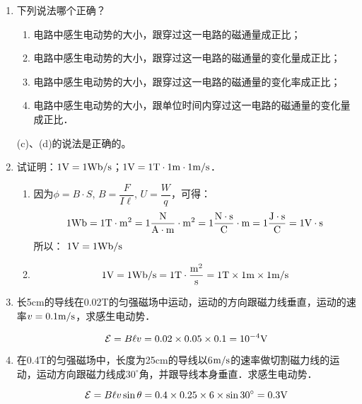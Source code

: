 \begin{enumerate}
    \item 下列说法哪个正确？
    \begin{enumerate}
        \item 电路中感生电动势的大小，跟穿过这一电路的磁通量成正比；
        \item 电路中感生电动势的大小，跟穿过这一电路的磁通量的变化量成正比；
        \item 电路中感生电动势的大小，跟穿过这一电路的磁通量的变化率成正比；
        \item 电路中感生电动势的大小，跟单位时间内穿过这一电路的磁通量的变化量成正比．
    \end{enumerate}

    \begin{solution}
    (c)、(d)的说法是正确的。
    \end{solution}
    
\item 试证明：$1{\rm V}=1{\rm Wb}/{\rm s}$；$1{\rm V}=1{\rm T}\cdot 1{\rm m}\cdot 1\text{m}/\text{s}$．

\begin{solution}
\begin{enumerate}
    \item  因为$\phi=B\cdot S$, $B=\dfrac{F}{I\ell}$, $U=\dfrac{W}{q}$，可得：
   \[ 1{\rm Wb}=1{\rm T\cdot m^2}=1\frac{{\rm N}}{{\rm A\cdot m}}\cdot {\rm m^2}=1\frac{{\rm N\cdot s}}{{\rm C}}\cdot {\rm m}=1\frac{\rm J\cdot s}{\rm C}=1{\rm V\cdot s}\]
    所以： $1{\rm V}=1{\rm Wb}/{\rm s}$
    \item  \[1{\rm V}=1{\rm Wb/s}=1{\rm T}\cdot \frac{\rm m^2}{\rm s}=1{\rm T}\times 1{\rm m}\times 1\text{m}/\text{s}\]
\end{enumerate}
\end{solution}

\item  长5cm的导线在0.02T的匀强磁场中运动，运动的方向跟磁力线垂直，运动的速率$v=0.1\text{m}/\text{s}$，求感生电动势．

\begin{solution}
\[\mathcal{E}=B\ell v=0.02\times 0.05\times 0.1=10^{-4}{\rm V}\]
\end{solution}

\item 在0.4T的匀强磁场中，长度为25cm的导线以6$\text{m}/\text{s}$的速率做切割磁力线的运动，运动方向跟磁力线成$30^{\circ}$角，并跟导线本身垂直．求感生电动势．

\begin{solution}
    \[\mathcal{E}=B\ell v\sin\theta=0.4\times 0.25\times 6\times \sin 30^{\circ}=0.3{\rm V}\]
\end{solution}


\end{enumerate}
